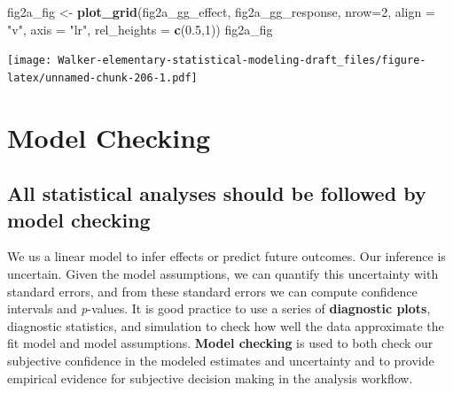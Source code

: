 \documentclass[]{book}
\newenvironment{Shaded}{\begin{snugshade}}{\end{snugshade}}
\newcommand{\DataTypeTok}[1]{\textcolor[rgb]{0.13,0.29,0.53}{#1}}
\newcommand{\DecValTok}[1]{\textcolor[rgb]{0.00,0.00,0.81}{#1}}
\newcommand{\FloatTok}[1]{\textcolor[rgb]{0.00,0.00,0.81}{#1}}
\newcommand{\KeywordTok}[1]{\textcolor[rgb]{0.13,0.29,0.53}{\textbf{#1}}}
\newcommand{\NormalTok}[1]{#1}
\newcommand{\StringTok}[1]{\textcolor[rgb]{0.31,0.60,0.02}{#1}}
\begin{document}
\begin{Shaded}
\begin{Highlighting}[]
\NormalTok{fig2a_fig <-}\StringTok{ }\KeywordTok{plot_grid}\NormalTok{(fig2a_gg_effect,}
\NormalTok{                       fig2a_gg_response,}
                       \DataTypeTok{nrow=}\DecValTok{2}\NormalTok{,}
                       \DataTypeTok{align =} \StringTok{"v"}\NormalTok{,}
                       \DataTypeTok{axis =} \StringTok{"lr"}\NormalTok{,}
                       \DataTypeTok{rel_heights =} \KeywordTok{c}\NormalTok{(}\FloatTok{0.5}\NormalTok{,}\DecValTok{1}\NormalTok{))}
\NormalTok{fig2a_fig}
\end{Highlighting}
\end{Shaded}

\texttt{[image: Walker-elementary-statistical-modeling-draft\_files/figure-latex/unnamed-chunk-206-1.pdf]}

\hypertarget{model-checking}{%
\chapter{Model Checking}\label{model-checking}}

\hypertarget{all-statistical-analyses-should-be-followed-by-model-checking}{%
\section{All statistical analyses should be followed by model checking}\label{all-statistical-analyses-should-be-followed-by-model-checking}}

We us a linear model to infer effects or predict future outcomes. Our inference is uncertain. Given the model assumptions, we can quantify this uncertainty with standard errors, and from these standard errors we can compute confidence intervals and \emph{p}-values. It is good practice to use a series of \textbf{diagnostic plots}, diagnostic statistics, and simulation to check how well the data approximate the fit model and model assumptions. \textbf{Model checking} is used to both check our subjective confidence in the modeled estimates and uncertainty and to provide empirical evidence for subjective decision making in the analysis workflow.
\end{document}

